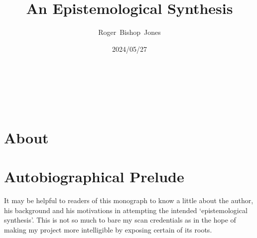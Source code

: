 \documentclass[10pt,titlepage]{book}
\title{\bf An Epistemological Synthesis}
\author{Roger~Bishop~Jones}
\date{\small 2024/05/27}
\newcommand{\ignore}[1]{}
\begin{document}
% 

                               
\begin{titlepage}
\maketitle





\end{titlepage}

\ \

\ignore{
\begin{centering}
{}
\end{centering}
}%

\setcounter{tocdepth}{2}
{\parskip-0pt\tableofcontents}


\hfill
\ 
\pagebreak







\section*{About}

\section*{Autobiographical Prelude}

It may be helpful to readers of this monograph to know a little about the author, his background and his motivations in attempting the intended `epistemological synthesis'.
This is not so much to bare my scan credentials as in the hope of making my project more intelligible by exposing certain of its roots.
\end{document}
